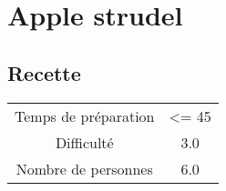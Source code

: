 \newpage
\section{Apple strudel}
    \label{sec:Apple strudel}
    \subsection{Recette}
    \vspace{1cm}


    \begin{center}
        \begin{tabular}{c|c}
            Temps de préparation & <= 45 \\
            Difficulté & 3.0 \\
            Nombre de personnes & 6.0 
        \end{tabular}
    \end{center}{}

    \vspace{1cm}
    \hline
    \vspace{1cm}


